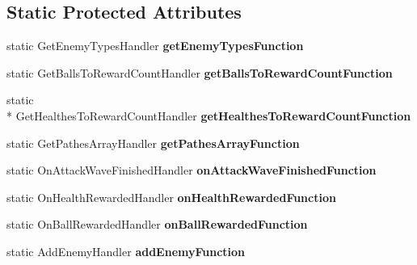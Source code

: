 \subsection*{Static Protected Attributes}
\begin{DoxyCompactItemize}
\item 
\hypertarget{class_j_g___attack_wave___base_ac2fe546212b7cac3526ed7249f3d7faf}{static Get\-Enemy\-Types\-Handler {\bfseries get\-Enemy\-Types\-Function}}\label{class_j_g___attack_wave___base_ac2fe546212b7cac3526ed7249f3d7faf}

\item 
\hypertarget{class_j_g___attack_wave___base_add6c10e9afb81571b060aced881a50c9}{static Get\-Balls\-To\-Reward\-Count\-Handler {\bfseries get\-Balls\-To\-Reward\-Count\-Function}}\label{class_j_g___attack_wave___base_add6c10e9afb81571b060aced881a50c9}

\item 
\hypertarget{class_j_g___attack_wave___base_a3992e58eaab212bf6c40a7d62ba2f780}{static \\*
Get\-Healthes\-To\-Reward\-Count\-Handler {\bfseries get\-Healthes\-To\-Reward\-Count\-Function}}\label{class_j_g___attack_wave___base_a3992e58eaab212bf6c40a7d62ba2f780}

\item 
\hypertarget{class_j_g___attack_wave___base_a83cedf47505a83f7c1a95a7dacbb0c53}{static Get\-Pathes\-Array\-Handler {\bfseries get\-Pathes\-Array\-Function}}\label{class_j_g___attack_wave___base_a83cedf47505a83f7c1a95a7dacbb0c53}

\item 
\hypertarget{class_j_g___attack_wave___base_a8d043885b3b3044a124ca1cb6ff11676}{static On\-Attack\-Wave\-Finished\-Handler {\bfseries on\-Attack\-Wave\-Finished\-Function}}\label{class_j_g___attack_wave___base_a8d043885b3b3044a124ca1cb6ff11676}

\item 
\hypertarget{class_j_g___attack_wave___base_afa6edd2b0d2d6ad40f5c64c9dd2271b2}{static On\-Health\-Rewarded\-Handler {\bfseries on\-Health\-Rewarded\-Function}}\label{class_j_g___attack_wave___base_afa6edd2b0d2d6ad40f5c64c9dd2271b2}

\item 
\hypertarget{class_j_g___attack_wave___base_a64fbfb8d3a8710b08a261c97116dd05d}{static On\-Ball\-Rewarded\-Handler {\bfseries on\-Ball\-Rewarded\-Function}}\label{class_j_g___attack_wave___base_a64fbfb8d3a8710b08a261c97116dd05d}

\item 
\hypertarget{class_j_g___attack_wave___base_ac93b8e2206fe78ce985d4424ba2e9ace}{static Add\-Enemy\-Handler {\bfseries add\-Enemy\-Function}}\label{class_j_g___attack_wave___base_ac93b8e2206fe78ce985d4424ba2e9ace}


\end{DoxyCompactItemize}
